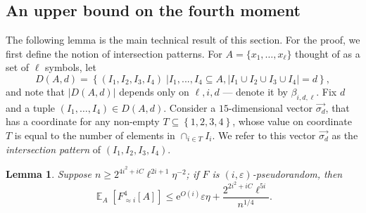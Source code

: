 \documentclass[11pt]{article}
\newtheorem{lemma}[theorem]{Lemma}
\newcommand{\eee}{\mathrm e}
\newcommand\card[1]{\left| {#1} \right|}
\newcommand\sett[2]{\left\{ \left. #1 \;\right\vert #2 \right\}}
\newcommand\set[1]{{\left\{ #1 \right\}}}
\newcommand\Expect[2]{{\mathop{\mathbb{E}}_{#1}\left[ {#2} \right]}}
\newcommand\eps{\varepsilon}
\renewcommand\geq{\geqslant}
\renewcommand\leq{\leqslant}
\newcommand\expp[1]{\eee^{O({#1})}}
\newcommand\approxlvlfn[2]{{#1}_{\approx{#2}}}
\begin{document}
\subsection{An upper bound on the fourth moment}
The following lemma is the main technical result of this section.
For the proof, we first define the notion of intersection patterns.
%
For $A = \{x_1,\ldots,x_{\ell}\}$ thought of as a set of $\ell$ symbols, let %
\[
D(A,d) = \sett{(I_1,I_2,I_3,I_4)}{I_1,...,I_4\subseteq A, \card{I_1\cup I_2\cup I_3\cup I_4} = d},
\]
and note that $\card{D(A,d)}$ depends only on $\ell,i,d$ --- denote it by $\beta_{i,d,\ell}$.
%
%
Fix $d$ and a tuple $(I_1,\ldots,I_4)\in D(A,d)$. Consider a $15$-dimensional
vector $\vec{\sigma_d}$, that has a coordinate for any non-empty $T\subseteq\set{1,2,3,4}$,
whose value on coordinate $T$ is equal to the number of elements in $\cap_{i\in T}{I_i}$.
We refer to this vector $\vec{\sigma_d}$ as the
\emph{intersection pattern}   %
 of $(I_1,I_2,I_3,I_4)$.
\begin{lemma}\label{lem:fourth_upper}
Suppose $n\geq 2^{4i^2+iC} \ell^{2i+1}\eta^{-2}$;
if $F$ is $(i,\eps)$-pseudorandom, then
\[
\Expect{A}{\approxlvlfn{F}{i}^4[A]}\leq
\expp{i} \eps\eta+ \frac{2^{2i^2+iC} \ell^{5i}}{n^{1/4}}.
\]
\end{lemma}
\end{document}
